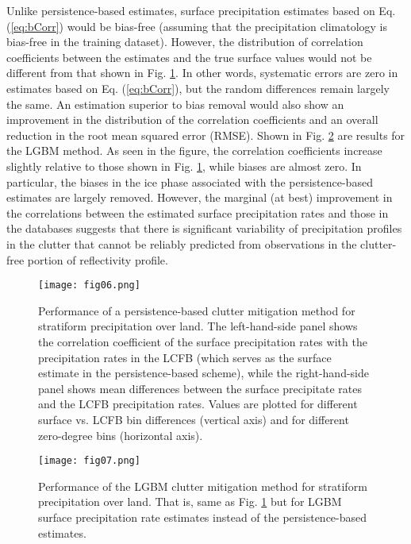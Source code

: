 \documentclass{ametsocV6.1} %
\begin{document}
Unlike persistence-based estimates, surface precipitation estimates based on Eq. (\ref{eq:bCorr}) would be bias-free (assuming that the precipitation climatology is bias-free in the training dataset).  However, the distribution of correlation coefficients between the estimates and the true surface values would not be different from that shown in Fig. \ref{fig:figPersistenceLand}. In other words, systematic errors are zero in estimates based on Eq. (\ref{eq:bCorr}),  but the random differences remain largely the same. An estimation superior to bias removal would also show an improvement in the distribution of the correlation coefficients and an overall reduction in the root mean squared error (RMSE).  Shown in Fig. \ref{fig:figLGBMLand} are results for the LGBM method. As seen in the figure, the correlation coefficients increase slightly relative to those shown in Fig. \ref{fig:figPersistenceLand}, while biases are almost zero.  In particular, the biases in the ice phase associated with the persistence-based estimates are largely removed.  However, the marginal (at best) improvement in the correlations between the estimated surface precipitation rates and those in the databases suggests that there is significant variability of precipitation profiles in the clutter that cannot be reliably predicted from observations in the clutter-free portion of reflectivity profile.


\begin{center}
\begin{figure}
\texttt{[image: fig06.png]}\\
\caption{Performance of a persistence-based clutter mitigation method for
 stratiform precipitation over land. The left-hand-side panel shows the correlation coefficient of the surface precipitation rates with the precipitation rates in the LCFB (which serves as the surface estimate in the persistence-based scheme), while the right-hand-side panel shows mean differences between the surface precipitate rates and the LCFB precipitation rates.  Values are plotted for different surface vs. LCFB bin differences (vertical axis) and for different zero-degree bins (horizontal axis).}
\label{fig:figPersistenceLand}
\end{figure}
\end{center}

\begin{center}
\begin{figure}
\texttt{[image: fig07.png]}
\caption{Performance of the LGBM clutter mitigation method for stratiform precipitation over land. That is, same as Fig. \ref{fig:figPersistenceLand} but for LGBM surface precipitation rate estimates instead of the persistence-based estimates.}
\label{fig:figLGBMLand}
\end{figure}
\end{center}
\end{document}
